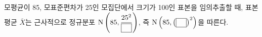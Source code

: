 모평균이 85, 모표준편차가 25인 모집단에서 크기가 100인 표본을 임의추출할 때, 표본평균 $\overline{X}$는 근사적으로 정규분포 $\mathrm{N}\left(85{,}\mkern3mu\mathopen{}\dfrac{25^2}{\blank}\right)$, 즉 $\mathrm{N}\left(85{,}\mkern3mu\mathopen{}\left(\blank\right)^{2}\right)$을 따른다.
